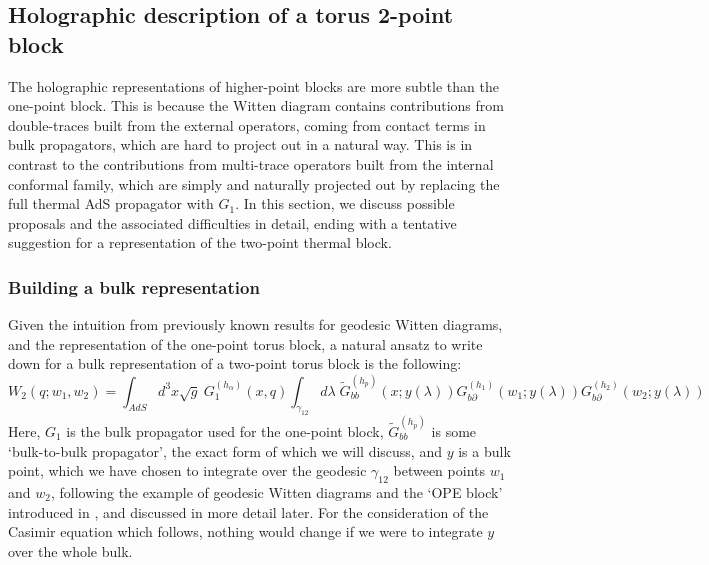 \documentclass[12pt]{article}
\def\p{\partial}
\begin{document}
\subsection{Holographic description of a torus 2-point block}

The holographic representations of higher-point blocks are more subtle than the one-point block. This is because the Witten diagram contains contributions from double-traces built from the external operators, coming from contact terms in bulk propagators, which are hard to project out in a natural way. This is in contrast to the contributions from multi-trace operators built from the internal conformal family, which are simply and naturally projected out by replacing the full thermal AdS propagator with $G_1$. In this section, we discuss possible proposals and the associated difficulties in detail, ending with a tentative suggestion for a representation of the two-point thermal block.



\subsubsection*{Building a bulk representation}

Given the intuition from previously known results for geodesic Witten diagrams, and the representation of the one-point torus block, a natural ansatz to write down for a bulk representation of a two-point torus block is the following:
\begin{equation}
\label{eq:HoloTwoPt}
W_2(q;w_1,w_2) =
\int_{AdS} \! d^3x \sqrt{g}  ~
G^{(h_\alpha)}_1(x,q)
\int_{ \gamma_{12}} d \lambda \;
\tilde{G}^{(h_p)}_{bb}(x;y(\lambda))
G^{(h_1)}_{b\p}(w_1;y(\lambda))
G^{(h_2)}_{b\p}(w_2;y(\lambda))
 \end{equation}
Here, $G_1$ is the bulk propagator used for the one-point block, $\tilde{G}^{(h_p)}_{bb}$ is some `bulk-to-bulk propagator', the exact form of which we will discuss, and $y$ is a bulk point, which we have chosen to integrate over the geodesic $\gamma_{12}$ between points $w_1$ and $w_2$, following the example of geodesic Witten diagrams and the `OPE block' introduced in \cite{Czech:2016xec}, and discussed in more detail later. For the consideration of the Casimir equation which follows, nothing would change if we were to integrate $y$ over the whole bulk.
\end{document}
